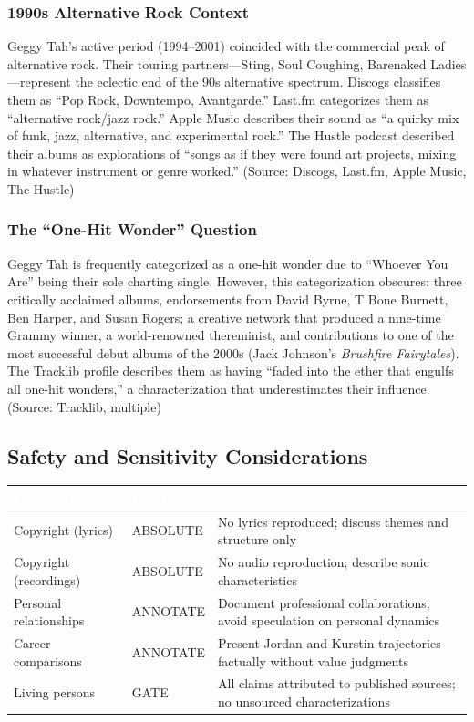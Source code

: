\documentclass[11pt,letterpaper]{article}
\newcommand{\tableheader}[1]{\textbf{\sffamily\textcolor{white}{#1}}}
\begin{document}
\subsubsection{1990s Alternative Rock Context}

Geggy Tah's active period (1994--2001) coincided with the commercial peak of alternative rock. Their touring partners---Sting, Soul Coughing, Barenaked Ladies---represent the eclectic end of the 90s alternative spectrum. Discogs classifies them as ``Pop Rock, Downtempo, Avantgarde.'' Last.fm categorizes them as ``alternative rock/jazz rock.'' Apple Music describes their sound as ``a quirky mix of funk, jazz, alternative, and experimental rock.'' The Hustle podcast described their albums as explorations of ``songs as if they were found art projects, mixing in whatever instrument or genre worked.'' (Source: Discogs, Last.fm, Apple Music, The Hustle)

\subsubsection{The ``One-Hit Wonder'' Question}

Geggy Tah is frequently categorized as a one-hit wonder due to ``Whoever You Are'' being their sole charting single. However, this categorization obscures: three critically acclaimed albums, endorsements from David Byrne, T Bone Burnett, Ben Harper, and Susan Rogers; a creative network that produced a nine-time Grammy winner, a world-renowned thereminist, and contributions to one of the most successful debut albums of the 2000s (Jack Johnson's \textit{Brushfire Fairytales}). The Tracklib profile describes them as having ``faded into the ether that engulfs all one-hit wonders,'' a characterization that underestimates their influence. (Source: Tracklib, multiple)

\subsection{Safety and Sensitivity Considerations}

\begin{center}
\begin{tabularx}{\textwidth}{L{3.5cm}L{2.5cm}X}
\toprule
{}
\tableheader{Consideration} & \tableheader{Level} & \tableheader{Handling} \\
\midrule
Copyright (lyrics) & ABSOLUTE & No lyrics reproduced; discuss themes and structure only \\
Copyright (recordings) & ABSOLUTE & No audio reproduction; describe sonic characteristics \\
Personal relationships & ANNOTATE & Document professional collaborations; avoid speculation on personal dynamics \\
Career comparisons & ANNOTATE & Present Jordan and Kurstin trajectories factually without value judgments \\
Living persons & GATE & All claims attributed to published sources; no unsourced characterizations \\
\bottomrule
\end{tabularx}
\end{center}
\end{document}

